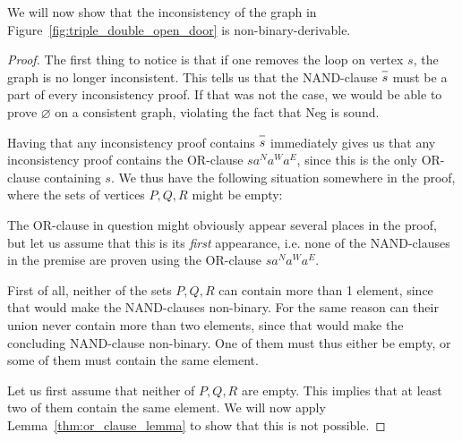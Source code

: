 We will now show that the inconsistency of the graph in Figure~\ref{fig:triple_double_open_door} is non-binary-derivable.
\begin{proof}
The first thing to notice is that if one removes the loop on vertex $s$, the graph is no longer inconsistent.
This tells us that the NAND-clause $\ol{s}$ must be a part of every inconsistency proof.
If that was not the case, we would be able to prove $\varnothing$ on a consistent graph, violating the fact that Neg is sound.

Having that any inconsistency proof contains $\ol{s}$ immediately gives us that any inconsistency proof contains the OR-clause $sa^Na^Wa^E$, since this is the only OR-clause containing $s$.
We thus have the following situation somewhere in the proof, where the sets of vertices $P,Q,R$ might be empty:\par
\begin{figure}[!h]
  \centering
  \begin{prooftree*}
    \Hypo{\dots}
    \Hypo{\dots}
    \Hypo{\dots}
  \end{prooftree*}
  \caption{}
  \label{fig:triple_double_proof_step}
\end{figure}
The OR-clause in question might obviously appear several places in the proof, but let us assume that this is its \textit{first} appearance, i.e. none of the NAND-clauses in the premise are proven using the OR-clause $sa^Na^Wa^E$.

First of all, neither of the sets $P,Q,R$ can contain more than 1 element, since that would make the NAND-clauses non-binary.
For the same reason can their union never contain more than two elements, since that would make the concluding NAND-clause non-binary.
One of them must thus either be empty, or some of them must contain the same element.

Let us first assume that neither of $P,Q,R$ are empty.
This implies that at least two of them contain the same element.
We will now apply Lemma~\ref{thm:or_clause_lemma} to show that this is not possible.


\end{proof}

